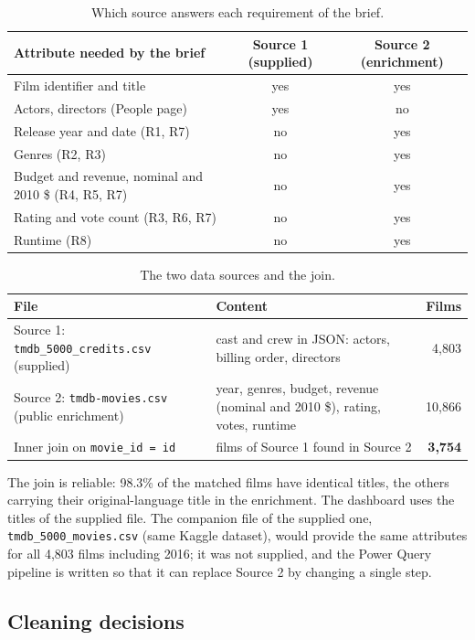 \documentclass[12pt,a4paper]{article}
\begin{document}
\begin{table}[H]\centering\small
\caption{Which source answers each requirement of the brief.}\label{tab:coverage}
\begin{tabularx}{\linewidth}{@{}Xcc@{}}
\toprule
Attribute needed by the brief & Source 1 (supplied) & Source 2 (enrichment)\\\midrule
Film identifier and title & yes & yes\\
Actors, directors (People page) & yes & no\\
Release year and date (R1, R7) & no & yes\\
Genres (R2, R3) & no & yes\\
Budget and revenue, nominal and 2010 \$ (R4, R5, R7) & no & yes\\
Rating and vote count (R3, R6, R7) & no & yes\\
Runtime (R8) & no & yes\\
\bottomrule
\end{tabularx}
\end{table}

\begin{table}[H]\centering\small
\caption{The two data sources and the join.}
\begin{tabularx}{\linewidth}{@{}lXr@{}}
\toprule
File & Content & Films\\\midrule
Source 1: \texttt{tmdb\_5000\_credits.csv} (supplied) & cast and crew in JSON: actors, billing order, directors & 4{,}803\\
Source 2: \texttt{tmdb-movies.csv} (public enrichment) & year, genres, budget, revenue (nominal and 2010 \$), rating, votes, runtime & 10{,}866\\
Inner join on \texttt{movie\_id = id} & films of Source 1 found in Source 2 & \textbf{3{,}754}\\
\bottomrule
\end{tabularx}
\end{table}

The join is reliable: 98.3\% of the matched films have identical titles, the others
carrying their original-language title in the enrichment. The dashboard uses the
titles of the supplied file. The companion file of the supplied one,
\texttt{tmdb\_5000\_movies.csv} (same Kaggle dataset), would provide the same attributes
for all 4{,}803 films including 2016; it was not supplied, and the Power Query
pipeline is written so that it can replace Source 2 by changing a single step.

\subsection{Cleaning decisions}
\end{document}
